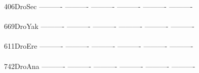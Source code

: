 \documentclass[11pt,twoside,reqno,a4paper]{article}
\begin{document}
{406\hspace*{2\charwidth}DroSec	----------	----------	----------	----------	----------	----------	\\
\hspace*{5\charwidth}\hspace*{7\charwidth}\hspace*{1\charwidth}\hspace*{1\charwidth}\hspace*{1\charwidth}\hspace*{1\charwidth}\hspace*{1\charwidth}\hspace*{1\charwidth}\\
669\hspace*{2\charwidth}DroYak	----------	----------	----------	----------	----------	----------	\\
\hspace*{5\charwidth}\hspace*{7\charwidth}\hspace*{1\charwidth}\hspace*{1\charwidth}\hspace*{1\charwidth}\hspace*{1\charwidth}\hspace*{1\charwidth}\hspace*{1\charwidth}\\
611\hspace*{2\charwidth}DroEre	----------	----------	----------	----------	----------	----------	\\
\hspace*{5\charwidth}\hspace*{7\charwidth}\hspace*{1\charwidth}\hspace*{1\charwidth}\hspace*{1\charwidth}\hspace*{1\charwidth}\hspace*{1\charwidth}\hspace*{1\charwidth}\\
742\hspace*{2\charwidth}DroAna	----------	----------	----------	----------	----------	----------	\\
\hspace*{5\charwidth}\hspace*{7\charwidth}\hspace*{1\charwidth}\hspace*{1\charwidth}\hspace*{1\charwidth}\hspace*{1\charwidth}\hspace*{1\charwidth}\hspace*{1\charwidth}\\
}
\end{document}
